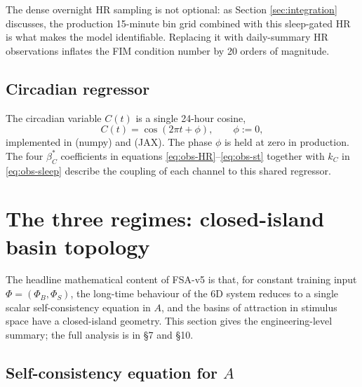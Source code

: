 \documentclass[11pt,a4paper]{article}
\theoremstyle{definition}
\begin{document}
The dense overnight HR sampling is not optional: as Section
\ref{sec:integration} discusses, the production 15-minute bin grid
combined with this sleep-gated HR is what makes the model
identifiable. Replacing it with daily-summary HR observations inflates
the FIM condition number by 20 orders of magnitude.

\subsection{Circadian regressor}

The circadian variable $C(t)$ is a single 24-hour cosine,
\begin{equation}
C(t) = \cos(2\pi t + \phi), \qquad \phi := 0,
\end{equation}
implemented in  (numpy) and
 (JAX). The phase $\phi$ is held at
zero in production. The four $\beta_C^*$ coefficients in equations
\eqref{eq:obs-HR}--\eqref{eq:obs-st} together with $k_C$ in
\eqref{eq:obs-sleep} describe the coupling of each channel to this
shared regressor.


\section{The three regimes: closed-island basin topology} \label{sec:basins}

The headline mathematical content of FSA-v5 is that, for constant
training input $\Phi = (\Phi_B, \Phi_S)$, the long-time behaviour of the
6D system reduces to a single scalar self-consistency equation in $A$,
and the basins of attraction in stimulus space have a closed-island
geometry. This section gives the engineering-level summary; the full
analysis is in  §7 and §10.

\subsection{Self-consistency equation for $A$}
\end{document}
